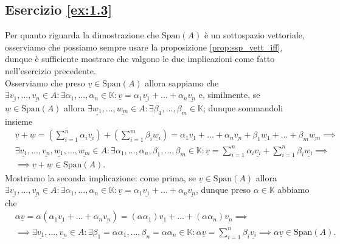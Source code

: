 \subsection*{Esercizio \ref{ex:1.3}}
Per quanto riguarda la dimostrazione che $\text{Span}(A)$ è un sottospazio vettoriale, osserviamo che possiamo sempre usare la proposizione \ref{prop:ssp_vett_iff}, dunque è sufficiente mostrare che valgono le due implicazioni come fatto nell'esercizio precedente. \\
Osserviamo che preso $\underline{v} \in \text{Span}(A)$ allora sappiamo che $\exists \underline{v_1}, \ldots, \underline{v_n} \in A : \exists \alpha_1, \ldots, \alpha_n \in \mathbb{K} : \underline{v} = \alpha_1 \underline{v_1} + \ldots + \alpha_n \underline{v_n}$ e, similmente, se $\underline{w} \in \text{Span}(A)$ allora $\exists \underline{w_1}, \ldots, \underline{w_m} \in A : \exists \beta_1, \ldots, \beta_m \in \mathbb{K}$; dunque sommandoli insieme
\begin{align}
    &\underline{v} + \underline{w} = (\sum_{i=1}^n \alpha_i \underline{v_i}) + (\sum_{i=1}^m \beta_i \underline{w_i}) = \alpha_1 \underline{v_1} + \ldots + \alpha_n \underline{v_n} + \beta_1 \underline{w_1} + \ldots + \beta_m \underline{w_m} \implies \\
    &\exists \underline{v_1}, \ldots, \underline{v_n}, \underline{w_1}, \ldots, \underline{w_m} \in A : \exists \alpha_1, \ldots, \alpha_n, \beta_1, \ldots, \beta_m \in \mathbb{K} : \underline{v} = \sum_{i=1}^n \alpha_i \underline{v_i} + \sum_{i=1}^n \beta_i \underline{w_i} \implies \\
    &\implies \underline{v} + \underline{w} \in \text{Span}(A).
\end{align}
Mostriamo la seconda implicazione: come prima, se $\underline{v} \in \text{Span}(A)$ allora $\exists \underline{v_1}, \ldots, \underline{v_n} \in A : \exists \alpha_1, \ldots, \alpha_n \in \mathbb{K} : \underline{v} = \alpha_1 \underline{v_1} + \ldots + \alpha_n \underline{v_n}$, dunque preso $\alpha \in \mathbb{K}$ abbiamo che
\begin{align}
&\alpha \underline{v} = \alpha (\alpha_1 \underline{v_1} + \ldots + \alpha_n \underline{v_n}) = (\alpha \alpha_1) \underline{v_1} + \ldots + (\alpha \alpha_n) \underline{v_n} \implies \\
&\implies \exists \underline{v_1}, \ldots, \underline{v_n} \in A : \exists \beta_1 = \alpha \alpha_1, \ldots, \beta_n = \alpha \alpha_n \in \mathbb{K} : \alpha \underline{v} = \sum_{i=1}^n \beta_i \underline{v_i} \implies \alpha \underline{v} \in \text{Span}(A).
\end{align}
